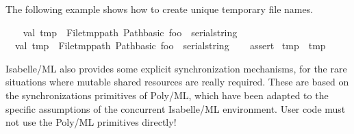 \begin{isabellebody}
\begin{isamarkuptext}
\begin{description}
  \end{description}%
\end{isamarkuptext}%
\isamarkuptrue%
%
\endisatagmlref
{\isafoldmlref}%
%
\isadelimmlref
%
\endisadelimmlref
%
\isadelimmlex
%
\endisadelimmlex
%
\isatagmlex
%
\begin{isamarkuptext}%
The following example shows how to create unique
  temporary file names.%
\end{isamarkuptext}%
\isamarkuptrue%
%
\endisatagmlex
{\isafoldmlex}%
%
\isadelimmlex
%
\endisadelimmlex
%
\isadelimML
%
\endisadelimML
%
\isatagML
{}\isamarkupfalse%
\ {}\isanewline
\ \ val\ tmp{}\ {}\ File{}tmp{}path\ {}Path{}basic\ {}{}foo{}\ {}\ serial{}string\ {}{}{}{}{}\isanewline
\ \ val\ tmp{}\ {}\ File{}tmp{}path\ {}Path{}basic\ {}{}foo{}\ {}\ serial{}string\ {}{}{}{}{}\isanewline
\ \ %
\isaantiq
assert{}%
\endisaantiq
\ {}tmp{}\ {}{}\ tmp{}{}{}\isanewline
{}%
\endisatagML
{\isafoldML}%
%
\isadelimML
%
\endisadelimML
%
\isamarkuptrue%
%
\begin{isamarkuptext}%
Isabelle/ML also provides some explicit synchronization
  mechanisms, for the rare situations where mutable shared resources
  are really required.  These are based on the synchronizations
  primitives of Poly/ML, which have been adapted to the specific
  assumptions of the concurrent Isabelle/ML environment.  User code
  must not use the Poly/ML primitives directly!


\end{isamarkuptext}
\end{isabellebody}
